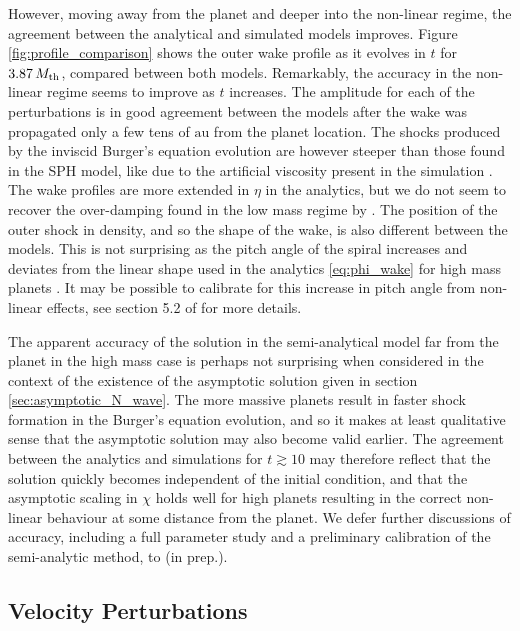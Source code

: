 However, moving away from the planet and deeper into the non-linear regime, the agreement between the analytical and simulated models improves.
Figure \ref{fig:profile_comparison} shows the outer wake profile as it evolves in $t$ for $3.87 \, M_{\rm th}$, compared between both models.
Remarkably, the accuracy in the non-linear regime seems to improve as $t$ increases.
The amplitude for each of the perturbations is in good agreement between the models after the wake was propagated only a few tens of $\mathrm{au}$ from the planet location.
The shocks produced by the inviscid Burger's equation evolution are however steeper than those found in the SPH model, like due to the artificial viscosity present in the simulation \citep{lodato2010}.
The wake profiles are more extended in $\eta$ in the analytics, but we do not seem to recover the over-damping found in the low mass regime by \citet{cimerman2021}.
The position of the outer shock in density, and so the shape of the wake, is also different between the models.
This is not surprising as the pitch angle of the spiral increases and deviates from the linear shape used in the analytics \ref{eq:phi_wake} for high mass planets \cite{zhu2015}.
It may be possible to calibrate for this increase in pitch angle from non-linear effects, see section 5.2 of \citet{cimerman2021} for more details.

The apparent accuracy of the solution in the semi-analytical model far from the planet in the high mass case is perhaps not surprising when considered in the context of the existence of the asymptotic solution given in section \ref{sec:asymptotic_N_wave}.
The more massive planets result in faster shock formation in the Burger's equation evolution, and so it makes at least qualitative sense that the asymptotic solution may also become valid earlier.
The agreement between the analytics and simulations for $t \gtrsim 10$ may therefore reflect that the solution quickly becomes independent of the initial condition, and that the asymptotic scaling in $\chi$ holds well for high planets resulting in the correct non-linear behaviour at some distance from the planet.
We defer further discussions of accuracy, including a full parameter study and a preliminary calibration of the semi-analytic method, to \citeauthor{fasanoinprep.} (in prep.).

\subsection{Velocity Perturbations} \label{sec:velocity_perts}

